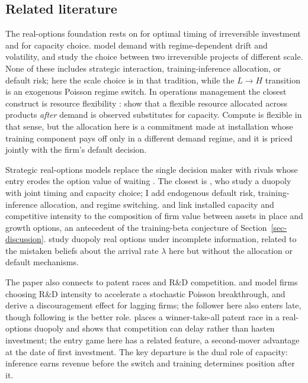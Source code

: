 \documentclass[
  11pt,
  letterpaper,
]{scrartcl}
\begin{document}
\subsection{Related literature}\label{sec-literature}

The real-options foundation rests on \citet{mcdonald1986value} for
optimal timing of irreversible investment and
\citet{pindyck1988irreversible} for capacity choice.
\citet{guo2005investment} model demand with regime-dependent drift and
volatility, and \citet{decamps2006irreversible} study the choice between
two irreversible projects of different scale. None of these includes
strategic interaction, training-inference allocation, or default risk;
here the scale choice is in that tradition, while the \(L \to H\)
transition is an exogenous Poisson regime switch. In operations
management the closest construct is resource flexibility
\citep{vanmieghem2003capacity}: \citet{chod2005resource} show that a
flexible resource allocated across products \emph{after} demand is
observed substitutes for capacity. Compute is flexible in that sense,
but the allocation here is a commitment made at installation whose
training component pays off only in a different demand regime, and it is
priced jointly with the firm's default decision.

Strategic real-options models replace the single decision maker with
rivals whose entry erodes the option value of waiting
\citep{grenadier2002option}. The closest is
\citet{huisman2015strategic}, who study a duopoly with joint timing and
capacity choice; I add endogenous default risk, training-inference
allocation, and regime switching. \citet{aguerrevere2003equilibrium} and
\citet{aguerrevere2009real} link installed capacity and competitive
intensity to the composition of firm value between assets in place and
growth options, an antecedent of the training-beta conjecture of
Section~\ref{sec-discussion}. \citet{lambrecht2003real} study duopoly
real options under incomplete information, related to the mistaken
beliefs about the arrival rate \(\lambda\) here but without the
allocation or default mechanisms.

The paper also connects to patent races and R\&D competition.
\citet{loury1979market} and \citet{reinganum1982strategic} model firms
choosing R\&D intensity to accelerate a stochastic Poisson breakthrough,
and \citet{harris1987racing} derive a discouragement effect for lagging
firms; the follower here also enters late, though following is the
better role. \citet{weeds2002strategic} places a winner-take-all patent
race in a real-options duopoly and shows that competition can delay
rather than hasten investment; the entry game here has a related
feature, a second-mover advantage at the date of first investment. The
key departure is the dual role of capacity: inference earns revenue
before the switch and training determines position after it.
\end{document}
